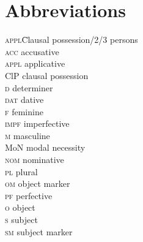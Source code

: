 \documentclass[output=paper]{langscibook}
\begin{document}
\section*{Abbreviations}
\begin{multicols}{3}
\begin{tabbing}
{\scshape appl}\hspace{1em}\=Clausal possession/2/3 \> persons\\ 
{\scshape acc} \>  accusative\\
{\scshape appl} \> applicative\\ 
ClP \>  clausal possession\\ 
{\scshape d} \> determiner\\ 
{\scshape dat} \> dative\\ 
{\scshape f} \> feminine\\ 
{\scshape impf} \> imperfective\\ 
{\scshape m} \> masculine\\ 
MoN \> modal necessity\\ 
{\scshape nom} \> nominative\\ 
{\scshape pl} \> plural\\ 
{\scshape om}  \>  object marker\\ 
{\scshape pf} \> perfective\\ 
{\scshape o} \> object\\ 
{\scshape s} \> subject\\ 
{\scshape sm} \> subject marker
\end{tabbing}
\end{multicols}

{\sloppy\printbibliography[heading=subbibliography,notkeyword=this]}
\end{document}
